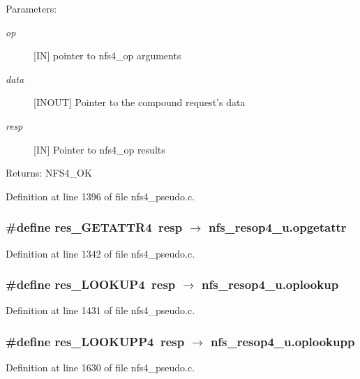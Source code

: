 \begin{Desc}
\item[Parameters:]
\begin{description}
\item[{\em op}][IN] pointer to nfs4\_\-op arguments \item[{\em data}][INOUT] Pointer to the compound request's data \item[{\em resp}][IN] Pointer to nfs4\_\-op results\end{description}
\end{Desc}
\begin{Desc}
\item[Returns:]NFS4\_\-OK \end{Desc}


Definition at line 1396 of file nfs4\_\-pseudo.c.
\subsubsection{\setlength{\rightskip}{0pt plus 5cm}\#define res\_\-GETATTR4\ resp $\rightarrow$ nfs\_\-resop4\_\-u.opgetattr}\label{nfs4__pseudo_8c_a4}




Definition at line 1342 of file nfs4\_\-pseudo.c.
\subsubsection{\setlength{\rightskip}{0pt plus 5cm}\#define res\_\-LOOKUP4\ resp $\rightarrow$ nfs\_\-resop4\_\-u.oplookup}\label{nfs4__pseudo_8c_a8}




Definition at line 1431 of file nfs4\_\-pseudo.c.
\subsubsection{\setlength{\rightskip}{0pt plus 5cm}\#define res\_\-LOOKUPP4\ resp $\rightarrow$ nfs\_\-resop4\_\-u.oplookupp}\label{nfs4__pseudo_8c_a10}




Definition at line 1630 of file nfs4\_\-pseudo.c.
